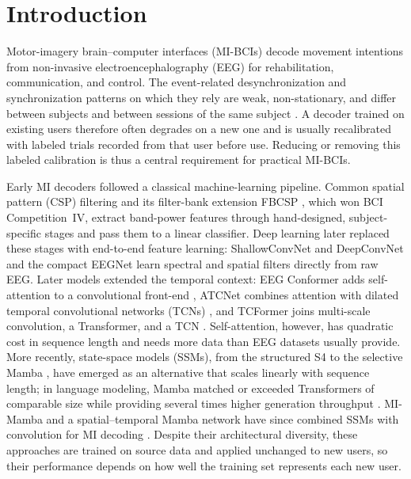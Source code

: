 \documentclass[preprint,12pt]{elsarticle}
\begin{document}
\section{Introduction}
\label{sec:introduction}

Motor-imagery brain--computer interfaces (MI-BCIs) decode movement intentions from non-invasive electroencephalography (EEG) for rehabilitation, communication, and control. The event-related desynchronization and synchronization patterns on which they rely are weak, non-stationary, and differ between subjects and between sessions of the same subject \cite{pfurtscheller1999erd}. A decoder trained on existing users therefore often degrades on a new one and is usually recalibrated with labeled trials recorded from that user before use. Reducing or removing this labeled calibration is thus a central requirement for practical MI-BCIs.

Early MI decoders followed a classical machine-learning pipeline. Common spatial pattern (CSP) filtering \cite{ramoser2000optimal} and its filter-bank extension FBCSP \cite{ang2012filterbank}, which won BCI Competition~IV, extract band-power features through hand-designed, subject-specific stages and pass them to a linear classifier. Deep learning later replaced these stages with end-to-end feature learning: ShallowConvNet and DeepConvNet \cite{schirrmeister2017deep} and the compact EEGNet \cite{lawhern2018eegnet} learn spectral and spatial filters directly from raw EEG. Later models extended the temporal context: EEG Conformer adds self-attention to a convolutional front-end \cite{song2023eegconformer}, ATCNet combines attention with dilated temporal convolutional networks (TCNs) \cite{altaheri2023atcnet}, and TCFormer joins multi-scale convolution, a Transformer, and a TCN \cite{altaheri2025tcformer}. Self-attention, however, has quadratic cost in sequence length \cite{vaswani2017attention} and needs more data than EEG datasets usually provide. More recently, state-space models (SSMs), from the structured S4 \cite{gu2022s4} to the selective Mamba \cite{gu2024mamba}, have emerged as an alternative that scales linearly with sequence length; in language modeling, Mamba matched or exceeded Transformers of comparable size while providing several times higher generation throughput \cite{gu2024mamba}. MI-Mamba and a spatial--temporal Mamba network have since combined SSMs with convolution for MI decoding \cite{guo2025mimamba,yang2025stmamba}. Despite their architectural diversity, these approaches are trained on source data and applied unchanged to new users, so their performance depends on how well the training set represents each new user.
\end{document}
